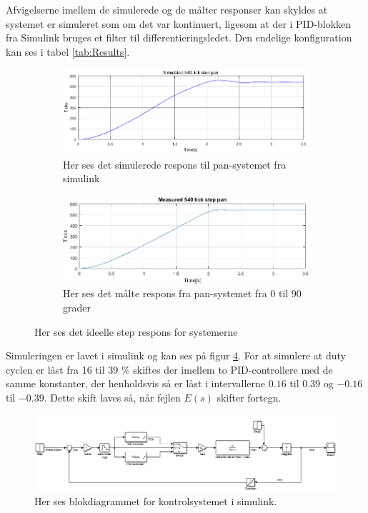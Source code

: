 Afvigelserne imellem de simulerede og de målter responser kan skyldes at systemet er simuleret som om det var kontinuert, ligesom at der i PID-blokken fra Simulink bruges et filter til differentieringsledet. Den endelige konfiguration kan ses i tabel \ref{tab:Results}.

\begin{figure}[t!]
    \centering
    \begin{subfigure}[t]{0.8\textwidth}
     \centering
        \includegraphics[width=1\textwidth]{Billeder/Simulated_Response_Pan.png}
        \caption{Her ses det simulerede respons til pan-systemet fra simulink}
        \label{fig:Simulated_Pan}
    \end{subfigure}
    \begin{subfigure}[b]{0.8\textwidth}
     \centering
        \includegraphics[width=1\textwidth]{Billeder/Measured_Response_Pan.PNG}
        \caption{Her ses det målte respons fra pan-systemet fra 0 til 90 grader}
        \label{fig:Measured_Pan}
    \end{subfigure}
    \caption{Her ses det ideelle step respons for systemerne}
\end{figure}

Simuleringen er lavet i simulink og kan ses på figur \ref{fig:Simulink}. For at simulere at duty cyclen er låst fra 16 til 39 $\%$ skiftes der imellem to PID-controllere med de samme konstanter, der henholdsvis så er låst i intervallerne $0.16$ til $0.39$ og $-0.16$ til $-0.39$. Dette skift laves så, når fejlen $E(s)$ skifter fortegn.

\begin{figure}
\centering
        \includegraphics[width=1\textwidth]{Billeder/Simulink.PNG}
        \caption{Her ses blokdiagrammet for kontrolsystemet i simulink.}
        \label{fig:Simulink}
\end{figure}

